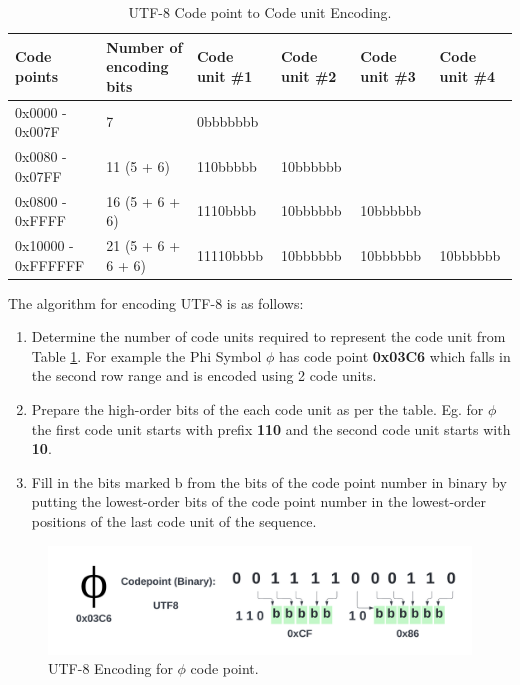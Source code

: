 {\renewcommand{\arraystretch}{1.5}%
\begin{table}[ht]
\centering
\begin{adjustbox}{width=1.1\textwidth,center=\textwidth}
\small
\begin{tabular}{|l|l|l|l|l|l|}
\hline
Code points        & Number of encoding bits & Code unit \#1 & Code unit \#2 & Code unit \#3 & Code unit \#4  \\
\hline
0x0000 - 0x007F & 7              & 0bbbbbbb &          &          &   \\
\hline
0x0080 - 0x07FF & 11 (5 + 6)     & 110bbbbb & 10bbbbbb &          &   \\
\hline
0x0800 - 0xFFFF & 16 (5 + 6 + 6) & 1110bbbb & 10bbbbbb & 10bbbbbb &   \\
\hline
0x10000 - 0xFFFFFF & 21 (5 + 6 + 6 + 6)      & 11110bbbb     & 10bbbbbb      & 10bbbbbb      & 10bbbbbb \\
\hline
\end{tabular}
\end{adjustbox}
\caption[UTF-8 Code Points Conversion]{UTF-8 Code point to Code unit Encoding.}\label{tab:utf8}
\end{table}}
The algorithm  for encoding UTF-8 \cite{utf8RFC} is as follows:
\begin{enumerate}
    \item Determine the number of code units required to represent the code unit from Table \ref{tab:utf8}. For example the Phi Symbol $\phi$ has code point \textbf{0x03C6} which falls in the second row range and is encoded using 2 code units.
    
    \item Prepare the high-order bits of the each code unit as per the table. Eg. for $\phi$ the first code unit starts with prefix \textbf{110} and the second code unit starts with \textbf{10}.
    
    \item Fill in the bits marked b from the bits of the code point number in binary by putting the lowest-order bits of
       the code point number in the lowest-order positions of the last
       code unit of the sequence.
\end{enumerate}

\begin{figure}[ht]
\includegraphics[trim=2cm 2cm 2cm 2cm,clip=true, width=\textwidth]{imgs/utf8-conv.png}
\caption[UTF8 Encoding]{UTF-8 Encoding for $\phi$ code point.}\label{fig:utf8-conv}
\end{figure}

